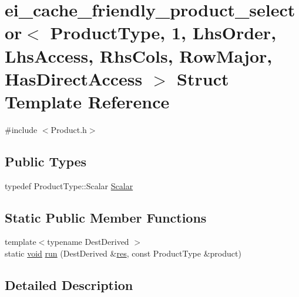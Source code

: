 \hypertarget{structei__cache__friendly__product__selector_3_01_product_type_00_011_00_01_lhs_order_00_01_lhs_627dd87edc006b05aea13eb6c873061a}{\section{ei\-\_\-cache\-\_\-friendly\-\_\-product\-\_\-selector$<$ Product\-Type, 1, Lhs\-Order, Lhs\-Access, Rhs\-Cols, Row\-Major, Has\-Direct\-Access $>$ Struct Template Reference}
\label{structei__cache__friendly__product__selector_3_01_product_type_00_011_00_01_lhs_order_00_01_lhs_627dd87edc006b05aea13eb6c873061a}
}


{\ttfamily \#include $<$Product.\-h$>$}

\subsection*{Public Types}
\begin{DoxyCompactItemize}
\item 
typedef Product\-Type\-::\-Scalar \hyperlink{structei__cache__friendly__product__selector_3_01_product_type_00_011_00_01_lhs_order_00_01_lhs_627dd87edc006b05aea13eb6c873061a_a8d7806ab88a07576c1327a55efeff5eb}{Scalar}
\end{DoxyCompactItemize}
\subsection*{Static Public Member Functions}
\begin{DoxyCompactItemize}
\item 
{\footnotesize template$<$typename Dest\-Derived $>$ }\\static \hyperlink{group___u_a_v_objects_plugin_ga444cf2ff3f0ecbe028adce838d373f5c}{void} \hyperlink{structei__cache__friendly__product__selector_3_01_product_type_00_011_00_01_lhs_order_00_01_lhs_627dd87edc006b05aea13eb6c873061a_a63d9bb812da9f3686e211a8dd66e1dff}{run} (Dest\-Derived \&\hyperlink{glext_8h_a1dbb21208b9047cc8031ca9c840d3c2f}{res}, const Product\-Type \&product)
\end{DoxyCompactItemize}


\subsection{Detailed Description}
